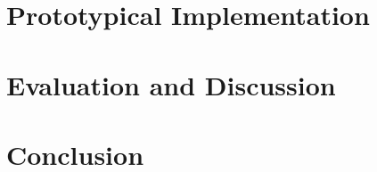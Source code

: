 \documentclass[language=english,noinputenc]{wiwwuwordrprt}
\begin{document}
      


  \chapter{Prototypical Implementation} %
    \label{cha:implementation}

    

  \chapter{Evaluation and Discussion} %
    \label{cha:evaluation}
    

  \chapter{Conclusion} %
    \label{cha:conclusion}
    

  
  
\end{document}
